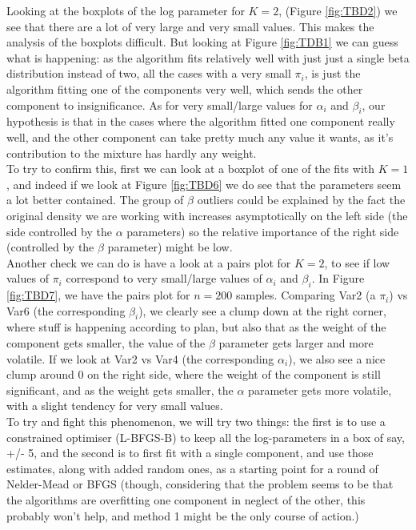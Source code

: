 \documentclass[10pt]{report}
\begin{document}
Looking at the boxplots of the log parameter for $K=2$, (Figure \ref{fig:TBD2}) we see that there are a lot of very large and very small values. This makes the analysis of the boxplots difficult. But looking at Figure \ref{fig:TDB1} we can guess what is happening: as the algorithm fits relatively well with just just a single beta distribution instead of two, all the cases with a very small $\pi_i$, is just the algorithm fitting one of the components very well, which sends the other component to insignificance. As for very small/large values for $\alpha_i$ and $\beta_i$, our hypothesis is that in the cases where the algorithm fitted one component really well, and the other component can take pretty much any value it wants, as it's contribution to the mixture has hardly any weight.
\\

To try to confirm this, first we can look at a boxplot of one of the fits with $K=1$, and indeed if we look at Figure \ref{fig:TBD6} we do see that the parameters seem a lot better contained. The group of $\beta$ outliers could be explained by the fact the original density we are working with increases asymptotically on the left side (the side controlled by the $\alpha$ parameters) so the relative importance of the right side (controlled by the $\beta$ parameter) might be low. 
\\

Another check we can do is have a look at a pairs plot for $K=2$, to see if low values of $\pi_i$ correspond to very small/large values of $\alpha_i$ and $\beta_i$. In Figure \ref{fig:TBD7}, we have the pairs plot for $n=200$ samples. Comparing Var2 (a $\pi_i$) vs Var6 (the corresponding $\beta_i$), we clearly see a clump down at the right corner, where stuff is happening according to plan, but also that as the weight of the component gets smaller, the value of the $\beta$ parameter gets larger and more volatile. If we look at Var2 vs Var4 (the corresponding $\alpha_i$), we also see a nice clump around $0$ on the right side, where the weight of the component is still significant, and as the weight gets smaller, the $\alpha$ parameter gets more volatile, with a slight tendency for very small values.
\\


To try and fight this phenomenon, we will try two things: the first is to use a constrained optimiser (L-BFGS-B) to keep all the log-parameters in a box of say, +/- 5, and the second is to first fit with a single component, and use those estimates, along with added random ones, as a starting point for a round of Nelder-Mead or BFGS (though, considering that the problem seems to be that the algorithms are overfitting one component in neglect of the other, this probably won't help, and method 1 might be the only course of action.)
\end{document}
